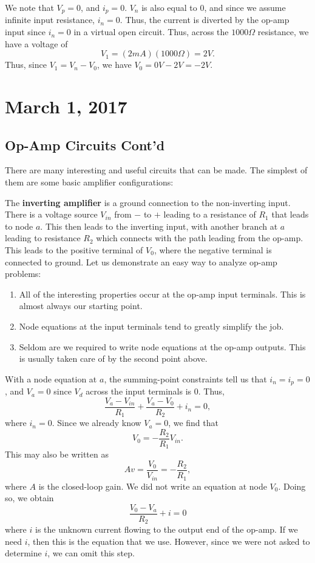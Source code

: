 \documentclass[11pt]{article}
\theoremstyle{plain} %
\theoremstyle{definition}
\theoremstyle{example}
\theoremstyle{remark}
\begin{document}
We note that $V_p=0$, and $i_p=0$. $V_n$ is also equal to 0, and since we assume infinite input resistance, $i_n=0$. Thus, the current is diverted by the op-amp input since $i_n=0$ in a virtual open circuit. Thus, across the $1000\Omega$ resistance, we have a voltage of 
$$V_1 = (2mA)(1000\Omega)  = 2V.$$
Thus, since $V_1 = V_n - V_0$, we have $V_0 = 0V-2V = -2V$.


\section{March 1, 2017}
\subsection{Op-Amp Circuits Cont'd}

There are many interesting and useful circuits that can be made. The simplest of them are some basic amplifier configurations:

The \textbf{inverting amplifier} is a ground connection to the non-inverting input. There is a voltage source $V_{in}$ from $-$ to $+$ leading to a resistance of $R_1$ that leads to node $a$. This then leads to the inverting input, with another branch at $a$ leading to resistance $R_2$ which connects with the path leading from the op-amp. This leads to the positive terminal of $V_0$, where the negative terminal is connected to ground. Let us demonstrate an easy way to analyze op-amp problems:
\begin{enumerate}
	\item All of the interesting properties occur at the op-amp input terminals. This is almost always our starting point. 
	\item Node equations at the input terminals tend to greatly simplify the job. 
	\item Seldom are we required to write node equations at the op-amp outputs. This is usually taken care of by the second point above. 
\end{enumerate}
With a node equation at $a$, the summing-point constraints tell us that $i_n=i_p=0$, and $V_a=0$ since $V_d$ across the input terminals is 0. Thus,
$$\frac{V_a-V_{in}}{R_1} + \frac{V_a-V_0}{R_2} + i_n = 0,$$
where $i_n=0$. Since we already know $V_a = 0$, we find that $$V_0 = -\frac{R_2}{R_1}V_{in}.$$ This may also be written as 
$$Av = \frac{V_0}{V_{in}} = -\frac{R_2}{R_1},$$
where $A$ is the closed-loop gain. We did not write an equation at node $V_0$. Doing so, we obtain
$$\frac{V_0-V_a}{R_2} + i = 0$$ where $i$ is the unknown current flowing to the output end of the op-amp. If we need $i$, then this is the equation that we use. However, since we were not asked to determine $i$, we can omit this step. 
\end{document}
